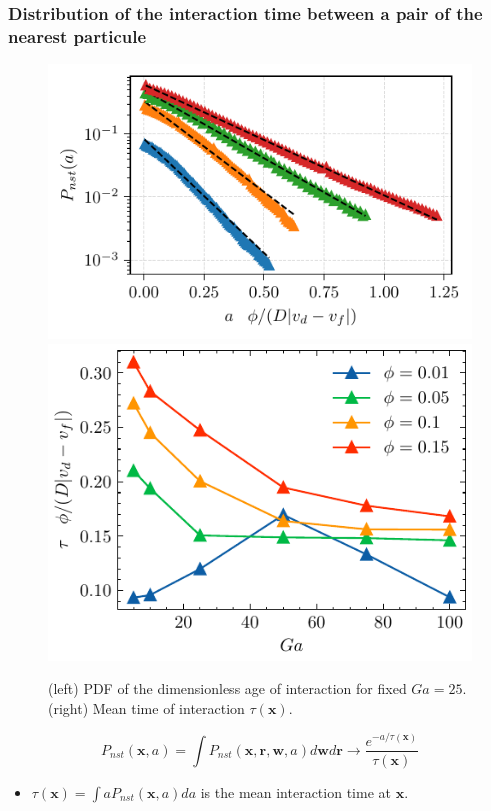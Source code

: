 \documentclass{sintefbeamer}
\begin{document}
\begin{frame}
  \frametitle{Distribution of the interaction time between a pair of the nearest particule}
    \begin{figure}
        \includegraphics[height=0.23\textwidth]{image/HOMOGENEOUS/fDrop/P_a_Ga_25.pdf}
        \includegraphics[height=0.23\textwidth]{image/HOMOGENEOUS/fPA/ageGa.pdf}
        \caption{ (left) PDF of the dimensionless age of interaction for fixed $Ga = 25$.
      (right) Mean time of interaction $\tau(\textbf{x})$.}
    \end{figure}
  \begin{equation*}
    P_{nst}(\textbf{x},a) 
    = \int P_{nst}(\textbf{x},\textbf{r},\textbf{w},a) d\textbf{w}d\textbf{r}
    \rightarrow\frac{e^{-a/\tau(\textbf{x})}}{\tau(\textbf{x})}
  \end{equation*}
\begin{itemize}
  \item $\tau(\textbf{x}) = \int a P_{nst}(\textbf{x},a) da$ is the mean interaction time at $\textbf{x}$. 
\end{itemize}
\end{frame}
\end{document}

